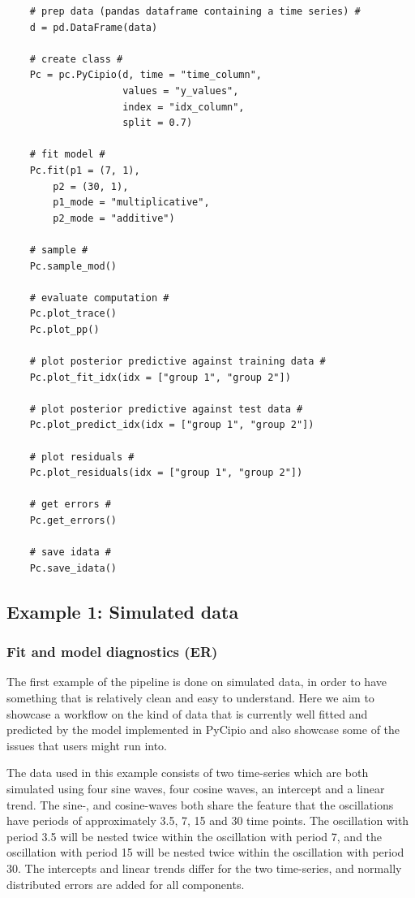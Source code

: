 \documentclass{article}
\begin{document}
\lstset{frame=lines}

\begin{lstlisting}
    # prep data (pandas dataframe containing a time series) #
    d = pd.DataFrame(data)
    
    # create class #
    Pc = pc.PyCipio(d, time = "time_column", 
                    values = "y_values", 
                    index = "idx_column", 
                    split = 0.7)
    
    # fit model #
    Pc.fit(p1 = (7, 1), 
        p2 = (30, 1), 
        p1_mode = "multiplicative", 
        p2_mode = "additive")
    
    # sample #
    Pc.sample_mod()
    
    # evaluate computation #
    Pc.plot_trace()
    Pc.plot_pp()
    
    # plot posterior predictive against training data #
    Pc.plot_fit_idx(idx = ["group 1", "group 2"])
    
    # plot posterior predictive against test data #
    Pc.plot_predict_idx(idx = ["group 1", "group 2"])
    
    # plot residuals #
    Pc.plot_residuals(idx = ["group 1", "group 2"])

    # get errors #
    Pc.get_errors()

    # save idata # 
    Pc.save_idata()
\end{lstlisting}


\subsection{Example 1: Simulated data}

\subsubsection{Fit and model diagnostics (ER)}

\noindent The first example of the pipeline is done on simulated data, in order to have something that is relatively clean and easy to understand. Here we aim to showcase a workflow on the kind of data that is currently well fitted and predicted by the model implemented in PyCipio and also showcase some of the issues that users might run into. 

\noindent The data used in this example consists of two time-series which are both simulated using four sine waves, four cosine waves, an intercept and a linear trend. The sine-, and cosine-waves both share the feature that the oscillations have periods of approximately 3.5, 7, 15 and 30 time points. The oscillation with period 3.5 will be nested twice within the oscillation with period 7, and the oscillation with period 15 will be nested twice within the oscillation with period 30. The intercepts and linear trends differ for the two time-series, and normally distributed errors are added for all components. 
\end{document}
